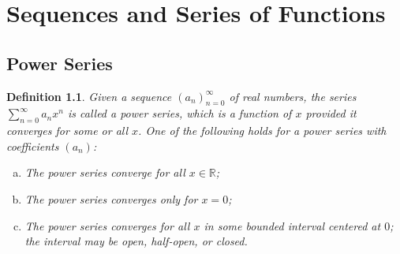 \documentclass[12pt, lettersize]{book}
\newtheorem{dfn}[thm]{Definition}
\newcommand{\R}{\mathbb{R}}
\begin{document}
	\chapter{Sequences and Series of Functions}
		\newpage
		\section{Power Series}
			\begin{dfn}
			Given a sequence $(a_n)_{n=0}^{\infty}$ of real numbers, the series $\sum_{n=0}^{\infty}a_nx^n$ is called 
			a power series, which is a function of $x$ provided it converges for some or all $x$. One of the following
			holds for a power series with coefficients $(a_n)$:
			\begin{enumerate}[(a)]
				\item The power series converge for all $x\in\R$;
				\item The power series converges only for $x=0$;
				\item The power series converges for all $x$ in some bounded interval centered at $0$; the interval may be
				open, half-open, or closed.
			\end{enumerate}
			\end{dfn}
			
\end{document}
